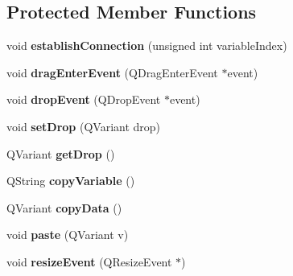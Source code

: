 \subsection*{Protected Member Functions}
\begin{DoxyCompactItemize}
\item 
\hypertarget{classQEImage_aaac63ce2e94f3b02229742512f84a9d5}{
void {\bfseries establishConnection} (unsigned int variableIndex)}
\label{classQEImage_aaac63ce2e94f3b02229742512f84a9d5}

\item 
\hypertarget{classQEImage_a25d2fe362c8cb4d6a680a75ea36065ea}{
void {\bfseries dragEnterEvent} (QDragEnterEvent $\ast$event)}
\label{classQEImage_a25d2fe362c8cb4d6a680a75ea36065ea}

\item 
\hypertarget{classQEImage_acfa9bef45a323af7928359e099f41fe1}{
void {\bfseries dropEvent} (QDropEvent $\ast$event)}
\label{classQEImage_acfa9bef45a323af7928359e099f41fe1}

\item 
\hypertarget{classQEImage_a44fd0a4a4c959f3bc1c7f5968c23d299}{
void {\bfseries setDrop} (QVariant drop)}
\label{classQEImage_a44fd0a4a4c959f3bc1c7f5968c23d299}

\item 
\hypertarget{classQEImage_a9da16dd956573bdd53726c80b13e1e6a}{
QVariant {\bfseries getDrop} ()}
\label{classQEImage_a9da16dd956573bdd53726c80b13e1e6a}

\item 
\hypertarget{classQEImage_a146851167874f5598f182f435b72ef58}{
QString {\bfseries copyVariable} ()}
\label{classQEImage_a146851167874f5598f182f435b72ef58}

\item 
\hypertarget{classQEImage_aaf71db13a5169c1d539325b9d12fa5a0}{
QVariant {\bfseries copyData} ()}
\label{classQEImage_aaf71db13a5169c1d539325b9d12fa5a0}

\item 
\hypertarget{classQEImage_ad9fcf1ffd178e97b60303b37ba6883f8}{
void {\bfseries paste} (QVariant v)}
\label{classQEImage_ad9fcf1ffd178e97b60303b37ba6883f8}

\item 
\hypertarget{classQEImage_abd420abb1e44f7b0aeb48f37aba1c932}{
void {\bfseries resizeEvent} (QResizeEvent $\ast$)}
\label{classQEImage_abd420abb1e44f7b0aeb48f37aba1c932}

\end{DoxyCompactItemize}
